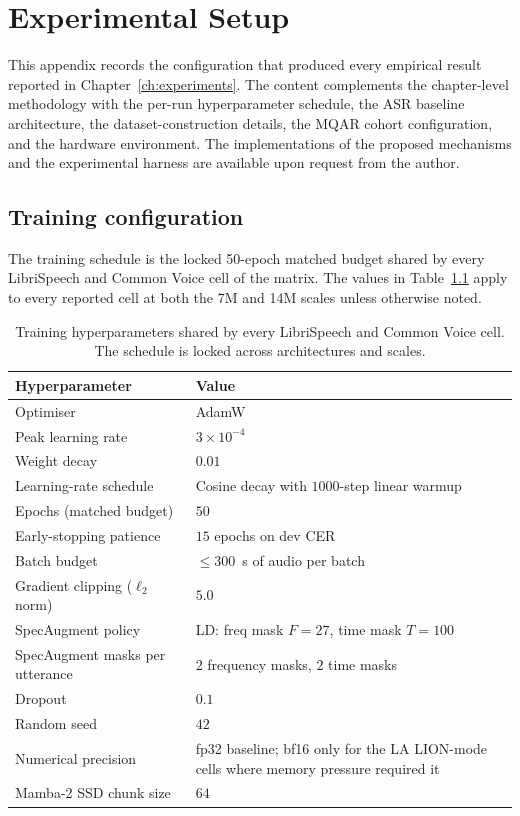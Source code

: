 \chapter{Experimental Setup}\label{app:experimental-setup}

This appendix records the configuration that produced every empirical
result reported in Chapter~\ref{ch:experiments}. The content
complements the chapter-level methodology with the per-run
hyperparameter schedule, the ASR baseline architecture, the
dataset-construction details, the MQAR cohort configuration, and the
hardware environment. The implementations of the proposed mechanisms
and the experimental harness are available upon request from the
author.

\section{Training configuration}\label{app:setup:training}

The training schedule is the locked 50-epoch matched budget shared by
every LibriSpeech and Common Voice cell of the matrix. The values in
Table~\ref{tab:setup:hyperparams} apply to every reported cell at
both the 7M and 14M scales unless otherwise noted.

\begin{table}[!htbp]
\centering
\small
\caption[Locked training hyperparameters]{Training hyperparameters
shared by every LibriSpeech and Common Voice cell. The schedule is
locked across architectures and scales.}
\label{tab:setup:hyperparams}
\setlength{\tabcolsep}{6pt}
\renewcommand{\arraystretch}{1.15}
\begin{tabularx}{\linewidth}{@{}p{4.5cm} X@{}}
\toprule
\textbf{Hyperparameter} & \textbf{Value} \\
\midrule
Optimiser & AdamW \\
Peak learning rate & $3 \times 10^{-4}$ \\
Weight decay & $0.01$ \\
Learning-rate schedule & Cosine decay with $1000$-step linear warmup \\
Epochs (matched budget) & $50$ \\
Early-stopping patience & $15$ epochs on dev CER \\
Batch budget & $\le 300$~s of audio per batch \\
Gradient clipping ($\ell_{2}$ norm) & $5.0$ \\
SpecAugment policy & LD: freq mask $F = 27$, time mask $T = 100$ \\
SpecAugment masks per utterance & $2$ frequency masks, $2$ time masks \\
Dropout & $0.1$ \\
Random seed & $42$ \\
Numerical precision & fp32 baseline; bf16 only for the LA LION-mode
cells where memory pressure required it \\
Mamba-2 SSD chunk size & $64$ \\
\bottomrule
\end{tabularx}
\end{table}

